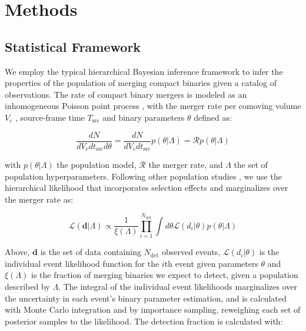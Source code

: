 \section{Methods} \label{sec:methods}

\subsection{Statistical Framework} \label{sec:statistical_framework}

We employ the typical hierarchical Bayesian inference framework to infer the properties of the population of merging compact binaries given a catalog of observations. The rate of compact binary mergers is modeled as an inhomogeneous Poisson point process \citep{10.1093/mnras/stz896}, with the merger rate per comoving volume $V_c$ \citep{astro-ph/9905116}, source-frame time $T_\text{src}$ and binary parameters $\theta$ defined as: 

\begin{equation} \label{eq:rate}
    \frac{dN}{dV_cdt_\mathrm{src}d\theta} = \frac{dN}{dV_cdt_\mathrm{src}} p(\theta | \Lambda) = \mathcal{R} p(\theta | \Lambda)
\end{equation}

\noindent with $p(\theta | \Lambda)$ the population model, $\mathcal{R}$ the merger rate, and $\Lambda$ the set of population hyperparameters. Following other population studies \citep{10.1093/mnras/stz896,2021ApJ...913L...7A,2111.03634,2007.05579}, we use the hierarchical likelihood \citep{10.1063/1.1835214} that incorporates selection effects and marginalizes over the merger rate as: 

\begin{equation} \label{eq:likelihood}
    \mathcal{L}(\bm{d} | \Lambda) \propto \frac{1}{\xi(\Lambda)} \prod_{i=1}^{N_\mathrm{det}} \int d\theta \mathcal{L}(d_i | \theta) p(\theta | \Lambda)
\end{equation}

\noindent Above, $\bm{d}$ is the set of data containing $N_\mathrm{det}$ observed events, $\mathcal{L}(d_i | \theta)$ is the individual event likelihood function for the $i$th event given parameters $\theta$ and $\xi(\Lambda)$ is the fraction of merging binaries we expect to detect, given a population described by $\Lambda$. The integral of the individual event likelihoods marginalizes over the uncertainty in each event's binary parameter estimation, and is calculated with Monte Carlo integration and by importance sampling, reweighing each set of posterior samples to the likelihood. The detection fraction is calculated with:

